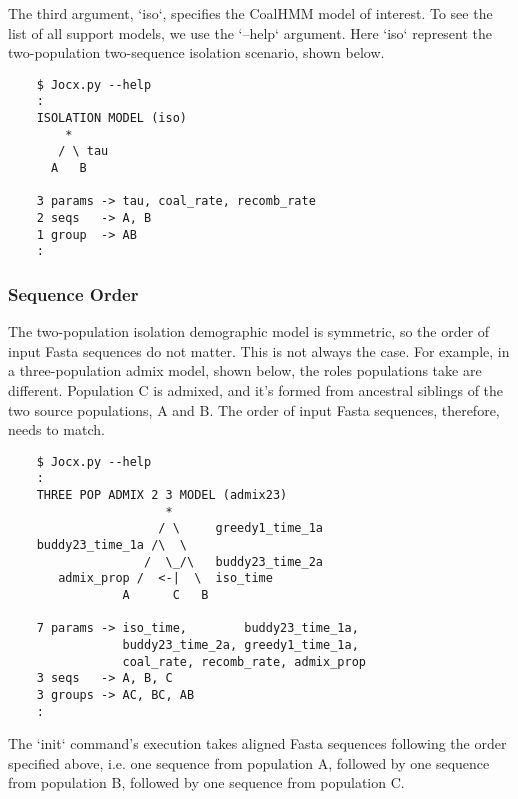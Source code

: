 The third argument, ‘iso‘, specifies the CoalHMM model of interest. To see the
list of all support models, we use the ‘–help‘ argument. Here ‘iso‘ represent
the two-population two-sequence isolation scenario, shown below.

{\small{}\begin{verbatim}
    $ Jocx.py --help
    :
    ISOLATION MODEL (iso)
        *
       / \ tau
      A   B

    3 params -> tau, coal_rate, recomb_rate
    2 seqs   -> A, B
    1 group  -> AB
    :
\end{verbatim}}

\subsubsection{Sequence Order}

The two-population isolation demographic model is symmetric, so the order of
input Fasta sequences do not matter. This is not always the case. For example,
in a three-population admix model, shown below, the roles populations take are
different. Population C is admixed, and it's formed from ancestral siblings of
the two source populations, A and B. The order of input Fasta sequences,
therefore, needs to match.

{\small{}\begin{verbatim}
    $ Jocx.py --help
    :
    THREE POP ADMIX 2 3 MODEL (admix23)
                      *
                     / \     greedy1_time_1a
    buddy23_time_1a /\  \
                   /  \_/\   buddy23_time_2a
       admix_prop /  <-|  \  iso_time
                A      C   B

    7 params -> iso_time,        buddy23_time_1a,
                buddy23_time_2a, greedy1_time_1a,
                coal_rate, recomb_rate, admix_prop
    3 seqs   -> A, B, C
    3 groups -> AC, BC, AB
    :
\end{verbatim}}

The ‘init‘ command's execution takes aligned Fasta sequences following the order
specified above, i.e. one sequence from population A, followed by one sequence
from population B, followed by one sequence from population C.

